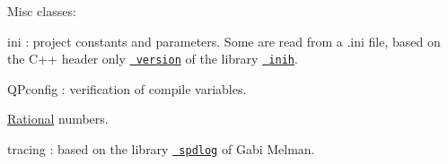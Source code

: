 Misc classes\+:


\begin{DoxyItemize}
\item ini \+: project constants and parameters. Some are read from a {\ttfamily .ini} file, based on the C++ header only \href{https://github.com/jtilly/inih}{\texttt{ version}} of the library \href{https://github.com/benhoyt/inih}{\texttt{ inih}}.
\item Q\+Pconfig \+: verification of compile variables.
\item \mbox{\hyperlink{classRational}{Rational}} numbers.
\item tracing \+: based on the library \href{https://github.com/gabime/spdlog}{\texttt{ spdlog}} of Gabi Melman. 
\end{DoxyItemize}